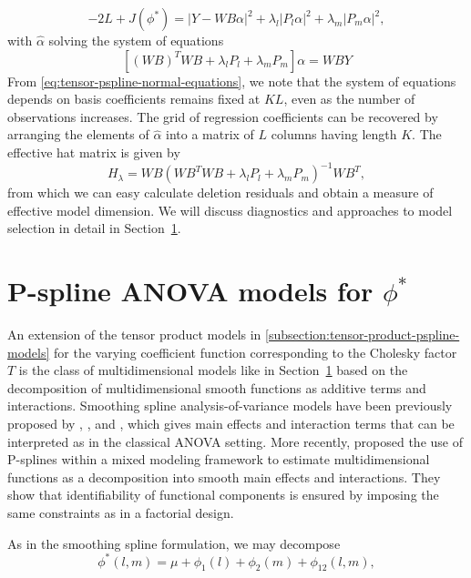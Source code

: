 \documentclass[12pt]{article}
\theoremstyle{definition}
\begin{document}
\begin{equation} \label{eq:tensor-pspline-objective-function}
-2L + J\left(\phi^*\right) = \vert Y - WB\alpha \vert^2 + \lambda_l \vert P_l \alpha \vert^2 + \lambda_m \vert P_m \alpha \vert^2,
\end{equation}
\noindent
with $\hat{\alpha}$ solving the system of equations 
\begin{equation} \label{eq:tensor-pspline-normal-equations}
\left[ \left(WB\right)^T WB +  \lambda_l P_l+ \lambda_m P_m\right]\alpha = W B Y
\end{equation}
\noindent
From \ref{eq:tensor-pspline-normal-equations}, we note that the system of equations depends on basis coefficients remains fixed at $KL$, even as the number of observations increases.   The grid of regression coefficients can be recovered by arranging the elements of $\hat{\alpha}$ into a matrix of $L$ columns having length $K$. The effective hat matrix is given by 
\[
H_\lambda = W B\left(W B^T W B +  \lambda_l P_l + \lambda_m P_m \right)^{-1} W B^T,
\]
from which we can easy calculate deletion residuals and obtain a measure of effective model dimension. We will discuss diagnostics and approaches to model selection in detail in Section~\ref{}.

\section{P-spline ANOVA models for $\phi^*$}

An extension of the tensor product models in \ref{subsection:tensor-product-pspline-models} for the varying coefficient function corresponding to the Cholesky factor $T$ is the class of multidimensional models like in Section~\ref{} based on the decomposition of multidimensional smooth functions as additive terms and interactions. Smoothing spline analysis-of-variance models have been previously proposed by \citet{gu1993semiparametric}, \citet{wahba1995smoothing}, and \citet{gu2002smoothing}, which gives main effects and interaction terms that can be interpreted as in the classical ANOVA setting. More recently, \citet{lee2011p} proposed the use of P-splines within a mixed modeling framework to estimate multidimensional functions as a decomposition into smooth main effects and interactions. They show that identifiability of functional components is ensured by imposing the same constraints as in a factorial design. 

As in the smoothing spline formulation, we may decompose
\begin{equation} \label{eq:SANOVA-model}
\phi^*\left(l,m\right) = \mu + \phi_1\left(l\right) + \phi_2\left(m\right) + \phi_{12}\left(l,m\right),
\end{equation} 
\end{document}
